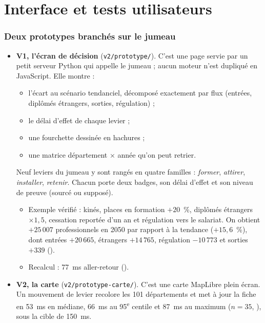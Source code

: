 \part{Interface et tests utilisateurs}

\section{Deux prototypes branchés sur le jumeau}
\begin{itemize}
  \item \textbf{V1, l'écran de décision} (\texttt{v2/prototype/}). C'est une page servie par un
        petit serveur Python qui appelle le jumeau ; aucun moteur n'est dupliqué en
        JavaScript. Elle montre :
        \begin{itemize}
          \item l'écart au scénario tendanciel, décomposé exactement par flux (entrées,
                diplômés étrangers, sorties, régulation) ;
          \item le délai d'effet de chaque levier ;
          \item une fourchette dessinée en hachures ;
          \item une matrice département × année qu'on peut retrier.
        \end{itemize}
        Neuf leviers du jumeau y sont rangés en quatre familles : \emph{former},
        \emph{attirer}, \emph{installer}, \emph{retenir}. Chacun porte deux badges, son délai
        d'effet et son niveau de preuve (sourcé ou supposé).
        \begin{itemize}
          \item Exemple vérifié : kinés, places en formation $+20$~\%, diplômés étrangers
                $\times 1{,}5$, cessation reportée d'un an et régulation vers le salariat. On
                obtient $+25\,007$ professionnels en 2050 par rapport à la tendance
                ($+15{,}6$~\%), dont entrées $+20\,665$, étrangers $+14\,765$, régulation
                $-10\,773$ et sorties $+339$ (\mesure).
          \item Recalcul : 77~ms aller-retour (\mesure).
        \end{itemize}
  \item \textbf{V2, la carte} (\texttt{v2/prototype-carte/}). C'est une carte MapLibre plein
        écran. Un mouvement de levier recolore les 101 départements et met à jour la fiche en
        53~ms en médiane, 66~ms au 95\textsuperscript{e} centile et 87~ms au maximum
        ($n=35$, \mesure), sous la cible de 150~ms.
\end{itemize}


